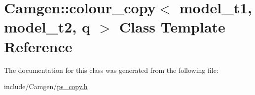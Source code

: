 \hypertarget{a00071}{\section{Camgen\-:\-:colour\-\_\-copy$<$ model\-\_\-t1, model\-\_\-t2, q $>$ Class Template Reference}
\label{a00071}
}


The documentation for this class was generated from the following file\-:\begin{DoxyCompactItemize}
\item 
include/\-Camgen/\hyperlink{a00712}{ps\-\_\-copy.\-h}\end{DoxyCompactItemize}
